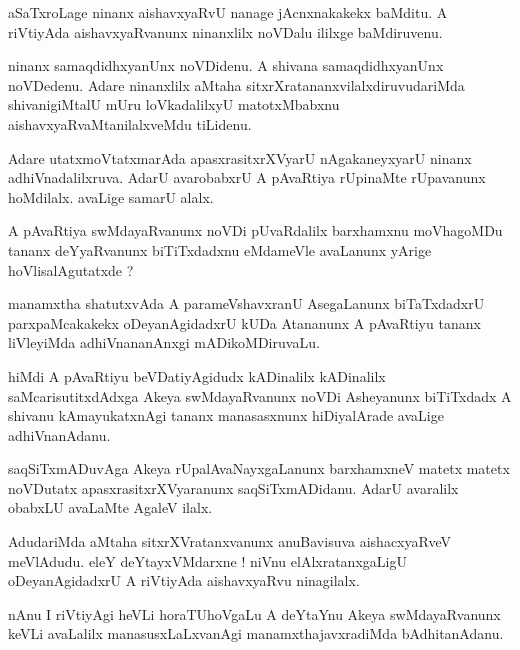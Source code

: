 \documentclass{article}
\begin{document}
\begin{mn}%
aSaTxroLage ninanx aishavxyaRvU nanage jAcnxnakakekx baMditu. A riVtiyAda aishavxyaRvanunx 
ninanxlilx noVDalu ililxge baMdiruvenu. 
\end{mn}

\begin{mn}%
ninanx samaqdidhxyanUnx noVDidenu. A shivana samaqdidhxyanUnx noVDedenu. Adare ninanxlilx aMtaha 
sitxrXratananxvilalxdiruvudariMda shivanigiMtalU mUru loVkadalilxyU matotxMbabxnu 
aishavxyaRvaMtanilalxveMdu tiLidenu.
\end{mn}


\begin{mn}%
Adare utatxmoVtatxmarAda apasxrasitxrXVyarU nAgakaneyxyarU ninanx adhiVnadalilxruva. AdarU 
avarobabxrU A pAvaRtiya rUpinaMte rUpavanunx hoMdilalx. avaLige samarU alalx.
\end{mn}

\begin{mn}%
A pAvaRtiya swMdayaRvanunx noVDi pUvaRdalilx barxhamxnu moVhagoMDu tananx deYyaRvanunx biTiTxdadxnu 
eMdameVle avaLanunx yArige hoVlisalAgutatxde ?
\end{mn}

\begin{mn}%
manamxtha shatutxvAda A parameVshavxranU AsegaLanunx biTaTxdadxrU parxpaMcakakekx oDeyanAgidadxrU 
kUDa Atananunx A pAvaRtiyu tananx liVleyiMda adhiVnananAnxgi mADikoMDiruvaLu.
\end{mn}

\begin{mn}%
hiMdi A pAvaRtiyu beVDatiyAgidudx kADinalilx kADinalilx saMcarisutitxdAdxga Akeya swMdayaRvanunx 
noVDi Asheyanunx biTiTxdadx A shivanu kAmayukatxnAgi tananx manasasxnunx hiDiyalArade avaLige 
adhiVnanAdanu.
\end{mn}

\begin{mn}%
saqSiTxmADuvAga Akeya rUpalAvaNayxgaLanunx barxhamxneV matetx matetx noVDutatx 
apasxrasitxrXVyaranunx saqSiTxmADidanu. AdarU avaralilx obabxLU avaLaMte AgaleV ilalx.
\end{mn}

\begin{mn}%
AdudariMda aMtaha sitxrXVratanxvanunx anuBavisuva aishacxyaRveV meVlAdudu. eleY deYtayxVMdarxne ! 
niVnu elAlxratanxgaLigU oDeyanAgidadxrU A riVtiyAda aishavxyaRvu ninagilalx.
\end{mn}

\begin{mn}%
nAnu I riVtiyAgi heVLi horaTUhoVgaLu A deYtaYnu Akeya swMdayaRvanunx keVLi avaLalilx 
manasusxLaLxvanAgi manamxthajavxradiMda bAdhitanAdanu.
\end{mn}
\end{document}
